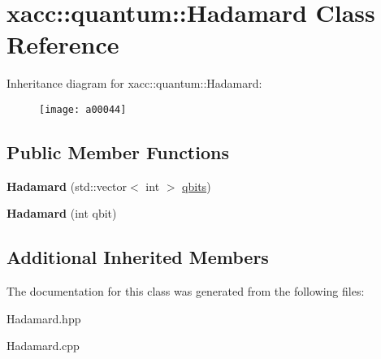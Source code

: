 \hypertarget{a00044}{}\section{xacc\+:\+:quantum\+:\+:Hadamard Class Reference}
\label{a00044}
Inheritance diagram for xacc\+:\+:quantum\+:\+:Hadamard\+:\begin{figure}[H]
\begin{center}
\leavevmode
\texttt{[image: a00044]}
\end{center}
\end{figure}
\subsection*{Public Member Functions}
\begin{DoxyCompactItemize}
\item 
{\bfseries Hadamard} (std\+::vector$<$ int $>$ \hyperlink{a00041_a2a56be6c2519ea65df4d06f4abae1393}{qbits})\hypertarget{a00044_a1f26925eeb4a52ca7e52dd9158fe7005}{}\label{a00044_a1f26925eeb4a52ca7e52dd9158fe7005}

\item 
{\bfseries Hadamard} (int qbit)\hypertarget{a00044_aac4e06aae35583bcce39b6b178948364}{}\label{a00044_aac4e06aae35583bcce39b6b178948364}

\end{DoxyCompactItemize}
\subsection*{Additional Inherited Members}


The documentation for this class was generated from the following files\+:\begin{DoxyCompactItemize}
\item 
Hadamard.\+hpp\item 
Hadamard.\+cpp\end{DoxyCompactItemize}
